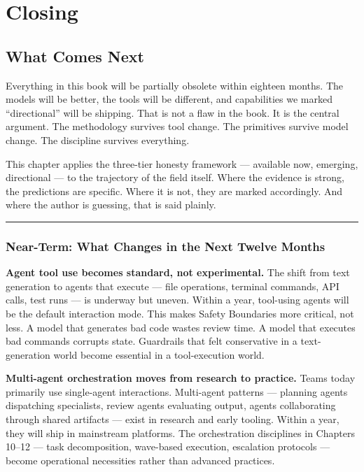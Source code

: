 \documentclass[
  a4paper,
  DIV=11,
  numbers=noendperiod]{scrreprt}
\begin{document}
\part{Closing}

\chapter{What Comes Next}\label{what-comes-next}

Everything in this book will be partially obsolete within eighteen
months. The models will be better, the tools will be different, and
capabilities we marked ``directional'' will be shipping. That is not a
flaw in the book. It is the central argument. The methodology survives
tool change. The primitives survive model change. The discipline
survives everything.

This chapter applies the three-tier honesty framework --- available now,
emerging, directional --- to the trajectory of the field itself. Where
the evidence is strong, the predictions are specific. Where it is not,
they are marked accordingly. And where the author is guessing, that is
said plainly.

\begin{center}\rule{0.5\linewidth}{0.5pt}\end{center}

\section{Near-Term: What Changes in the Next Twelve
Months}\label{near-term-what-changes-in-the-next-twelve-months}

\textbf{Agent tool use becomes standard, not experimental.} The shift
from text generation to agents that execute --- file operations,
terminal commands, API calls, test runs --- is underway but uneven.
Within a year, tool-using agents will be the default interaction mode.
This makes Safety Boundaries more critical, not less. A model that
generates bad code wastes review time. A model that executes bad
commands corrupts state. Guardrails that felt conservative in a
text-generation world become essential in a tool-execution world.

\textbf{Multi-agent orchestration moves from research to practice.}
Teams today primarily use single-agent interactions. Multi-agent
patterns --- planning agents dispatching specialists, review agents
evaluating output, agents collaborating through shared artifacts ---
exist in research and early tooling. Within a year, they will ship in
mainstream platforms. The orchestration disciplines in Chapters 10--12
--- task decomposition, wave-based execution, escalation protocols ---
become operational necessities rather than advanced practices.
\end{document}

